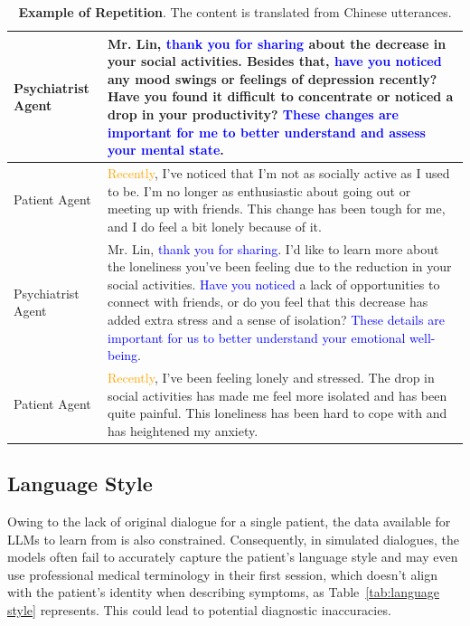 \begin{table}[!h]
    \centering
    \begin{tabular}{m{2cm}m{6cm}}
    \toprule
         Psychiatrist Agent & Mr. Lin, \textcolor{blue}{thank you for sharing} about the decrease in your social activities. Besides that, \textcolor{blue}{have you noticed} any mood swings or feelings of depression recently? Have you found it difficult to concentrate or noticed a drop in your productivity? \textcolor{blue}{These changes are important for me to better understand and assess your mental state}. \\
    \midrule
         Patient Agent & \textcolor{orange}{Recently}, I've noticed that I'm not as socially active as I used to be. I'm no longer as enthusiastic about going out or meeting up with friends. This change has been tough for me, and I do feel a bit lonely because of it. \\
    \midrule
         Psychiatrist Agent & Mr. Lin, \textcolor{blue}{thank you for sharing}. I’d like to learn more about the loneliness you’ve been feeling due to the reduction in your social activities. \textcolor{blue}{Have you noticed} a lack of opportunities to connect with friends, or do you feel that this decrease has added extra stress and a sense of isolation? \textcolor{blue}{These details are important for us to better understand your emotional well-being}. \\
    \midrule
         Patient Agent& \textcolor{orange}{Recently}, I've been feeling lonely and stressed. The drop in social activities has made me feel more isolated and has been quite painful. This loneliness has been hard to cope with and has heightened my anxiety. \\
    \bottomrule
    \end{tabular}
    \caption{\textbf{Example of Repetition}. The content is translated from Chinese utterances.}
    \label{tab:repetition}
\end{table}



\subsection{Language Style}
Owing to the lack of original dialogue for a single patient, the data available for LLMs to learn from is also constrained. Consequently, in simulated dialogues, the models often fail to accurately capture the patient's language style and may even use professional medical terminology in their first session, which doesn't align with the patient's identity when describing symptoms, as Table~\ref{tab:language style} represents. This could lead to potential diagnostic inaccuracies.

